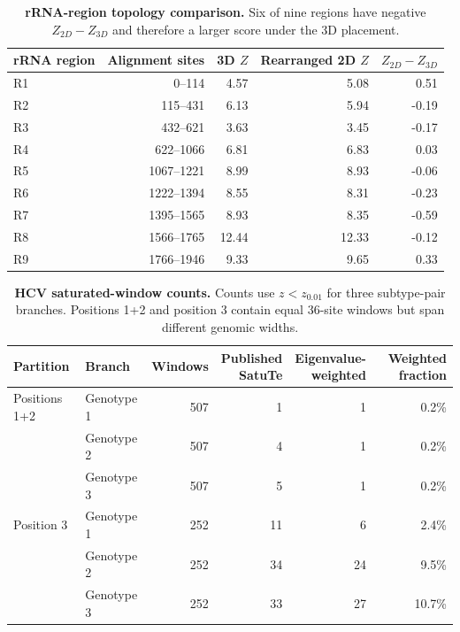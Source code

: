 \begin{table}[p]
  \centering
  \small
  \begin{tabular}{lrrrr}
    \toprule
    rRNA region & Alignment sites & 3D \(Z\) & Rearranged 2D \(Z\) & \(Z_{2D}-Z_{3D}\) \\
    \midrule
    R1 & 0--114 & 4.57 & 5.08 & 0.51 \\
    R2 & 115--431 & 6.13 & 5.94 & -0.19 \\
    R3 & 432--621 & 3.63 & 3.45 & -0.17 \\
    R4 & 622--1066 & 6.81 & 6.83 & 0.03 \\
    R5 & 1067--1221 & 8.99 & 8.93 & -0.06 \\
    R6 & 1222--1394 & 8.55 & 8.31 & -0.23 \\
    R7 & 1395--1565 & 8.93 & 8.35 & -0.59 \\
    R8 & 1566--1765 & 12.44 & 12.33 & -0.12 \\
    R9 & 1766--1946 & 9.33 & 9.65 & 0.33 \\
    \bottomrule
  \end{tabular}
  \caption{\textbf{rRNA-region topology comparison.} Six of nine regions have negative \(Z_{2D}-Z_{3D}\) and therefore a larger score under the 3D placement.}
  \makeatletter{}\makeatother
\end{table}

\begin{table}[p]
  \centering
  \small
  \begin{tabular}{llrrrr}
    \toprule
    Partition & Branch & Windows & \shortstack{Published\\SatuTe} & \shortstack{Eigenvalue-\\weighted} & Weighted fraction \\
    \midrule
    Positions 1+2 & Genotype 1 & 507 & 1 & 1 & 0.2\% \\
     & Genotype 2 & 507 & 4 & 1 & 0.2\% \\
     & Genotype 3 & 507 & 5 & 1 & 0.2\% \\
    \addlinespace
    Position 3 & Genotype 1 & 252 & 11 & 6 & 2.4\% \\
     & Genotype 2 & 252 & 34 & 24 & 9.5\% \\
     & Genotype 3 & 252 & 33 & 27 & 10.7\% \\
    \bottomrule
  \end{tabular}
  \caption{\textbf{HCV saturated-window counts.} Counts use \(z<z_{0.01}\) for three subtype-pair branches. Positions 1+2 and position 3 contain equal 36-site windows but span different genomic widths.}
  \makeatletter{}\makeatother
\end{table}

\clearpage
